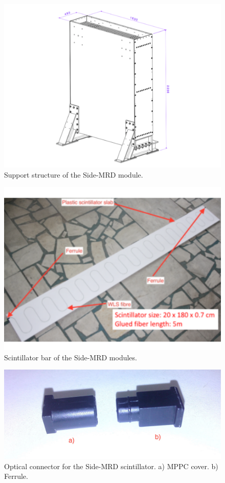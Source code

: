 \begin{figure}[tbh]
\begin{center}
\includegraphics[width=0.8\linewidth]{fig/side_mrd_structure.pdf}
\end{center}
\caption{
Support structure of the Side-MRD module.
}
\label{fig:side_mrd_support_structure}
\end{figure}

\begin{figure}[tbh]
\begin{center}
\includegraphics[width=0.8\linewidth]{fig/side_mrd_scintillator.pdf}
\end{center}
\caption{
Scintillator bar of the Side-MRD modules.
}
\label{fig:side_mrd_scintillator}
\end{figure}

\begin{figure}[tbh]
\begin{center}
\includegraphics[width=0.8\linewidth]{fig/side_mrd_optical_con.pdf}
\end{center}
\caption{
Optical connector for the Side-MRD scintillator. a) MPPC cover. b) Ferrule.
}
\label{fig:side_mrd_optical_con}
\end{figure}

